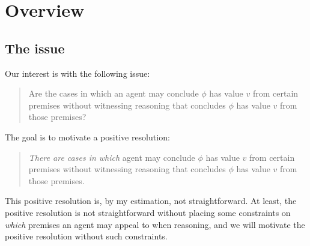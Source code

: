 \chapter{Overview}
\label{cha:overview}

\section{The issue}
\label{sec:issue}

\begin{note}
  Our interest is with the following issue:

  \begin{quote}
    Are the cases in which an agent may conclude \(\phi\) has value \(v\) from certain premises without witnessing reasoning that concludes \(\phi\) has value \(v\) from those premises?
  \end{quote}

  The goal is to motivate a positive resolution:

  \begin{quote}
    \emph{There are cases in which} agent may conclude \(\phi\) has value \(v\) from certain premises without witnessing reasoning that concludes \(\phi\) has value \(v\) from those premises.
  \end{quote}

  This positive resolution is, by my estimation, not straightforward.
  At least, the positive resolution is not straightforward without placing some constraints on \emph{which} premises an agent may appeal to when reasoning, and we will motivate the positive resolution without such constraints.
\end{note}

